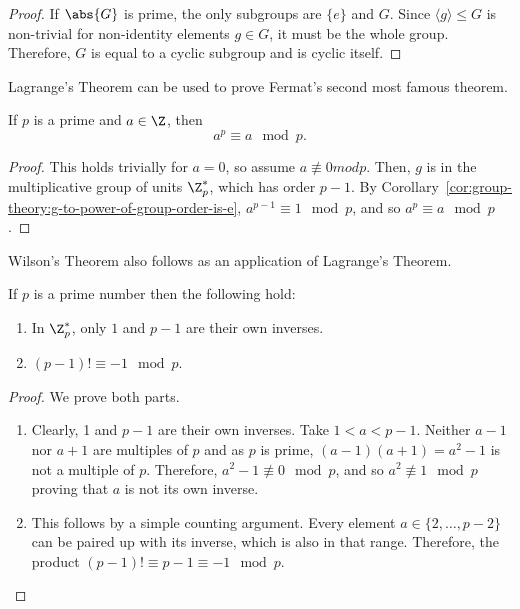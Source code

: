 \documentclass[12pt]{report}
\begin{document}
\begin{proof}
  If \(\abs{G}\) is prime, the only subgroups are \(\{e\}\) and \(G\).
  Since \(\langle g \rangle \leq G\) is non-trivial for non-identity elements \(g \in G\), it must be the whole group.
  Therefore, \(G\) is equal to a cyclic subgroup and is cyclic itself.
\end{proof}


Lagrange's Theorem can be used to prove Fermat's second most famous theorem.

\begin{theorem}
 \label{thm:group-theory:fermats-little-theorem}
 If \(p\) is a prime and \(a \in \Z\), then
 \[a^{p} \equiv a \mod p.\]
\end{theorem}

\begin{proof}
  This holds trivially for \(a = 0\), so assume \(a \not\equiv 0 mod p\).
  Then, \(g\) is in the multiplicative group of units \(\Z^{*}_{p}\), which has order \(p-1\). By Corollary~\ref{cor:group-theory:g-to-power-of-group-order-is-e}, \(a^{p-1} \equiv 1 \mod p\), and so \(a^{p} \equiv a \mod p\).
\end{proof}

Wilson's Theorem also follows as an application of Lagrange's Theorem.

\begin{theorem}
  \label{thm:group-theory:wilsons-theorem}
  If \(p\) is a prime number then the following hold:
  \begin{enumerate}
  \item
    In \(\Z^{*}_{p}\), only \(1\) and \(p-1\) are their own inverses.
  \item
    \((p - 1)! \equiv -1 \mod p\).
  \end{enumerate}
\end{theorem}

\begin{proof}
  We prove both parts.
  \begin{enumerate}
  \item
    Clearly, 1 and \(p-1\) are their own inverses.
    Take \(1 < a < p -1\).
    Neither \(a-1\) nor \(a+1\) are multiples of \(p\) and as \(p\) is prime, \((a-1)(a+1) = a^{2} -1\) is not a multiple of \(p\).
    Therefore, \(a^{2}-1 \not\equiv 0 \mod p\), and so \(a^{2} \not\equiv 1 \mod p\) proving that \(a\) is not its own inverse.

  \item
    This follows by a simple counting argument.
    Every element \(a \in \{2, \ldots, p-2\}\) can be paired up with its inverse, which is also in that range.
    Therefore, the product \((p-1)! \equiv p-1 \equiv -1 \mod p\).
  \end{enumerate}
\end{proof}
\end{document}
